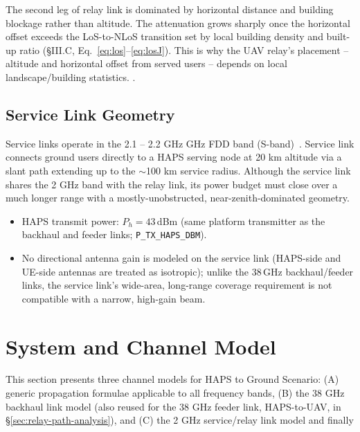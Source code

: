 \documentclass[conference]{IEEEtran}
\begin{document}
The second leg of relay link is dominated by
horizontal distance and building blockage rather than altitude. The attenuation grows sharply once
the horizontal offset exceeds the LoS-to-NLoS transition set by local building density and
built-up ratio (\S III.C, Eq.~\eqref{eq:los}--\eqref{eq:losJ}). This is why the UAV relay's
placement -- altitude and horizontal offset from served users -- depends on local landscape/building statistics. .

\subsection{Service Link Geometry}

Service links operate in the 2.1 -- 2.2 GHz  GHz FDD band (S-band)~\cite{3gpp_ts38101_5}. Service link connects
ground users directly to a HAPS serving node at 20 km altitude via a slant path extending up to the $\sim$100 km
service radius. Although the service link shares the 2 GHz band with the relay link, its power budget
 must close over a much longer range with a mostly-unobstructed, near-zenith-dominated geometry.
\begin{itemize}
  \item HAPS transmit power: $P_h = 43$\,dBm (same platform transmitter as the backhaul and feeder links; \texttt{P\_TX\_HAPS\_DBM}).
  \item No directional antenna gain is modeled on the service link (HAPS-side and UE-side antennas are treated as isotropic); unlike the 38\,GHz backhaul/feeder links, the service link's wide-area, long-range coverage requirement is not compatible with a narrow, high-gain beam.
\end{itemize}

\section{System and Channel Model}

This section presents three channel models for HAPS to Ground Scenario: (A) generic propagation formulae applicable to all frequency bands, (B) the 38 GHz backhaul link model (also reused for the 38 GHz feeder link, HAPS-to-UAV, in \S\ref{sec:relay-path-analysis}), and (C) the 2 GHz service/relay link model and finally

\end{document}
